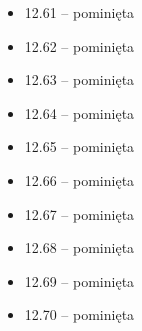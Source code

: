 \begin{multicols}{3}
\begin{itemize}
    \item 12.61 -- pominięta
    \item 12.62 -- pominięta
    \item 12.63 -- pominięta
    \item 12.64 -- pominięta
    \item 12.65 -- pominięta
    \item 12.66 -- pominięta
    \item 12.67 -- pominięta
    \item 12.68 -- pominięta
    \item 12.69 -- pominięta
    \item 12.70 -- pominięta

\end{itemize}
\end{multicols}
